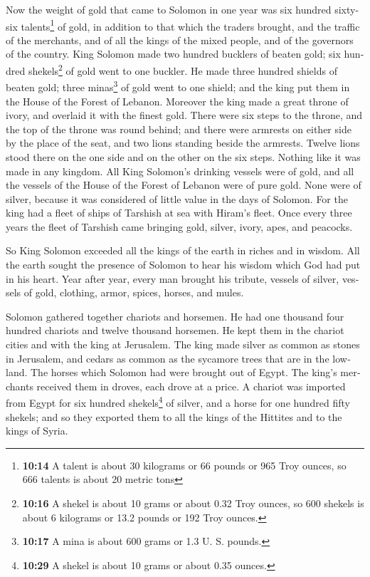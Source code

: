 \begin{paracol}{2}
\begin{otherlanguage}{english}
 Now the weight of gold that came to Solomon in one year
was six hundred sixty-six talents\footnote{\textbf{10:14} A talent is
  about 30 kilograms or 66 pounds or 965 Troy ounces, so 666 talents is
  about 20 metric tons} of gold,  in addition to that
which the traders brought, and the traffic of the merchants, and of all
the kings of the mixed people, and of the governors of the country.
 King Solomon made two hundred bucklers of beaten gold;
six hundred shekels\footnote{\textbf{10:16} A shekel is about 10 grams
  or about 0.32 Troy ounces, so 600 shekels is about 6 kilograms or 13.2
  pounds or 192 Troy ounces.} of gold went to one buckler.
 He made three hundred shields of beaten gold; three
minas\footnote{\textbf{10:17} A mina is about 600 grams or 1.3 U. S.
  pounds.} of gold went to one shield; and the king put them in the
House of the Forest of Lebanon.  Moreover the king made a
great throne of ivory, and overlaid it with the finest gold.
 There were six steps to the throne, and the top of the
throne was round behind; and there were armrests on either side by the
place of the seat, and two lions standing beside the armrests.
 Twelve lions stood there on the one side and on the
other on the six steps. Nothing like it was made in any kingdom.
 All King Solomon's drinking vessels were of gold, and
all the vessels of the House of the Forest of Lebanon were of pure gold.
None were of silver, because it was considered of little value in the
days of Solomon.  For the king had a fleet of ships of
Tarshish at sea with Hiram's fleet. Once every three years the fleet of
Tarshish came bringing gold, silver, ivory, apes, and peacocks.

 So King Solomon exceeded all the kings of the earth in
riches and in wisdom.  All the earth sought the presence
of Solomon to hear his wisdom which God had put in his heart.
 Year after year, every man brought his tribute, vessels
of silver, vessels of gold, clothing, armor, spices, horses, and mules.

 Solomon gathered together chariots and horsemen. He had
one thousand four hundred chariots and twelve thousand horsemen. He kept
them in the chariot cities and with the king at Jerusalem.
 The king made silver as common as stones in Jerusalem,
and cedars as common as the sycamore trees that are in the lowland.
 The horses which Solomon had were brought out of Egypt.
The king's merchants received them in droves, each drove at a price.
 A chariot was imported from Egypt for six hundred
shekels\footnote{\textbf{10:29} A shekel is about 10 grams or about 0.35
  ounces.} of silver, and a horse for one hundred fifty shekels; and so
they exported them to all the kings of the Hittites and to the kings of
Syria.


\end{otherlanguage}
\end{paracol}
